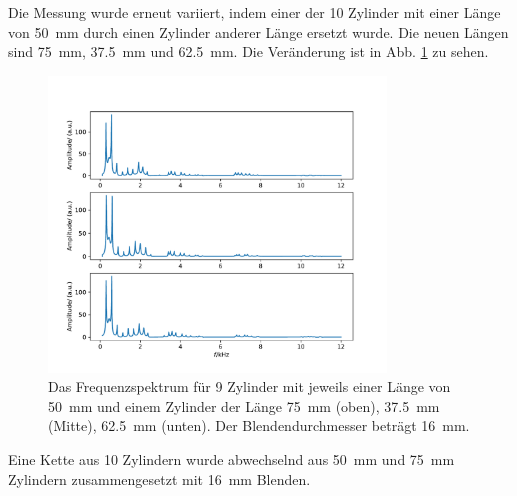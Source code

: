 Die Messung wurde erneut variiert, indem einer der \num{10} Zylinder mit einer Länge von \SI{50}{\milli\meter} durch einen Zylinder anderer Länge ersetzt wurde. Die neuen Längen sind \SI{75}{\milli\meter}, \SI{37.5}{\milli\meter} und \SI{62.5}{\milli\meter}.
Die Veränderung ist in Abb. \ref{fig:var3} zu sehen.
\begin{figure}
    \centering
    \includegraphics[width=0.8\textwidth]{plots/B_4.pdf}
    \caption{Das Frequenzspektrum für 9 Zylinder mit jeweils einer Länge von \SI{50}{\milli\metre} und einem Zylinder der Länge \SI{75}{\milli\metre} (oben), \SI{37.5}{\milli\metre} (Mitte), \SI{62.5}{\milli\metre} (unten). Der Blendendurchmesser beträgt \SI{16}{\milli\metre}.}
    \label{fig:var3}
\end{figure}


Eine Kette aus 10 Zylindern wurde abwechselnd aus \SI{50}{\milli\meter} und \SI{75}{\milli\meter} Zylindern zusammengesetzt mit \SI{16}{\milli\meter} Blenden.

